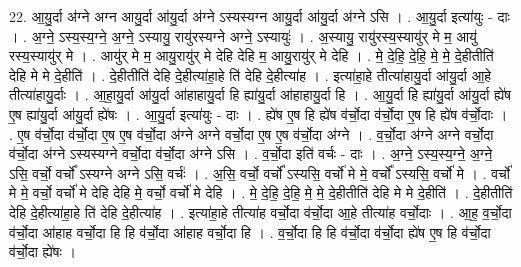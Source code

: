 \documentclass[17pt]{extarticle}
\begin{document}
22. आ॒यु॒र्दा अ॑ग्ने अग्न आयु॒र्दा आ॑यु॒र्दा अ॑ग्ने ऽस्यस्यग्न आयु॒र्दा आ॑यु॒र्दा अ॑ग्ने ऽसि । . आ॒यु॒र्दा इत्या॑युः - दाः । . अ॒ग्ने॒ ऽस्य॒स्य॒ग्ने॒ अ॒ग्ने॒ ऽस्यायु॒ रायु॑रस्यग्ने अग्ने॒ ऽस्यायुः॑ । . अ॒स्यायु॒ रायु॑रस्य॒स्यायु॑र् मे म॒ आयु॑ रस्य॒स्यायु॑र् मे । . आयु॑र् मे म॒ आयु॒रायु॑र् मे देहि देहि म॒ आयु॒रायु॑र् मे देहि । . मे॒ दे॒हि॒ दे॒हि॒ मे॒ मे॒ दे॒हीतीति॑ देहि मे मे दे॒हीति॑ । . दे॒हीतीति॑ देहि दे॒हीत्या॑हा॒हे ति॑ देहि दे॒हीत्या॑ह । . इत्या॑हा॒हे तीत्या॑हायु॒र्दा आ॑यु॒र्दा आ॒हे तीत्या॑हायु॒र्दाः । . आ॒हा॒यु॒र्दा आ॑यु॒र्दा आ॑हाहायु॒र्दा हि ह्या॑यु॒र्दा आ॑हाहायु॒र्दा हि । . आ॒यु॒र्दा हि ह्या॑यु॒र्दा आ॑यु॒र्दा ह्ये॑ष ए॒ष ह्या॑यु॒र्दा आ॑यु॒र्दा ह्ये॑षः । . आ॒यु॒र्दा इत्या॑युः - दाः । . ह्ये॑ष ए॒ष हि ह्ये॑ष व॑र्चो॒दा व॑र्चो॒दा ए॒ष हि ह्ये॑ष व॑र्चो॒दाः । . ए॒ष व॑र्चो॒दा व॑र्चो॒दा ए॒ष ए॒ष व॑र्चो॒दा अ॑ग्ने अग्ने वर्चो॒दा ए॒ष ए॒ष व॑र्चो॒दा अ॑ग्ने । . व॒र्चो॒दा अ॑ग्ने अग्ने वर्चो॒दा व॑र्चो॒दा अ॑ग्ने ऽस्यस्यग्ने वर्चो॒दा व॑र्चो॒दा अ॑ग्ने ऽसि । . व॒र्चो॒दा इति॑ वर्चः - दाः । . अ॒ग्ने॒ ऽस्य॒स्य॒ग्ने॒ अ॒ग्ने॒ ऽसि॒ वर्चो॒ वर्चो᳚ ऽस्यग्ने अग्ने ऽसि॒ वर्चः॑ । . अ॒सि॒ वर्चो॒ वर्चो᳚ ऽस्यसि॒ वर्चो॑ मे मे॒ वर्चो᳚ ऽस्यसि॒ वर्चो॑ मे । . वर्चो॑ मे मे॒ वर्चो॒ वर्चो॑ मे देहि देहि मे॒ वर्चो॒ वर्चो॑ मे देहि । . मे॒ दे॒हि॒ दे॒हि॒ मे॒ मे॒ दे॒हीतीति॑ देहि मे मे दे॒हीति॑ । . दे॒हीतीति॑ देहि दे॒हीत्या॑हा॒हे ति॑ देहि दे॒हीत्या॑ह । . इत्या॑हा॒हे तीत्या॑ह वर्चो॒दा व॑र्चो॒दा आ॒हे तीत्या॑ह वर्चो॒दाः । . आ॒ह॒ व॒र्चो॒दा व॑र्चो॒दा आ॑हाह वर्चो॒दा हि हि व॑र्चो॒दा आ॑हाह वर्चो॒दा हि । . व॒र्चो॒दा हि हि व॑र्चो॒दा व॑र्चो॒दा ह्ये॑ष ए॒ष हि व॑र्चो॒दा व॑र्चो॒दा ह्ये॑षः । \newline
\end{document}
